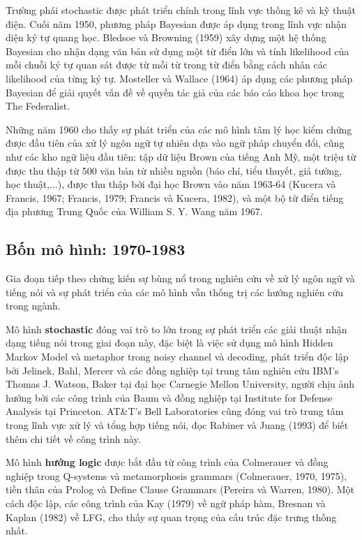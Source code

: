 Trường phái stochastic được phát triển chính trong lĩnh vực thống kê và kỹ thuật điện. Cuối năm 1950, phương pháp Bayesian được áp dụng trong lĩnh vực nhận diện ký tự quang học. Bledsoe và Browning (1959) xây dựng một hệ thống Bayesian cho nhận dạng văn bản sử dụng một từ điển lớn và tính likelihood của mỗi chuỗi ký tự quan sát được từ mỗi từ trong từ điển bằng cách nhân các likelihood của từng ký tự. Mosteller và Wallace (1964) áp dụng các phương pháp Bayesian để giải quyết vấn đề về quyền tác giả của các báo cáo khoa học trong The Federalist.

Những năm 1960 cho thấy sự phát triển của các mô hình tâm lý học kiểm chứng được đầu tiên của xử lý ngôn ngữ tự nhiên dựa vào ngữ pháp chuyển đổi, cũng như các kho ngữ liệu đầu tiên: tập dữ liệu Brown của tiếng Anh Mỹ, một triệu từ được thu thập từ 500 văn bản từ nhiều nguồn (báo chí, tiểu thuyết, giả tưởng, học thuật,...), được thu thập bởi đại học Brown vào năm 1963-64 (Kucera và Francis, 1967; Francis, 1979; Francis và Kucera, 1982), và một bộ từ điển tiếng địa phương Trung Quốc của William S. Y. Wang năm 1967.

\subsection{Bốn mô hình: 1970-1983}

Gia đoạn tiếp theo chứng kiến sự bùng nổ trong nghiên cứu về xử lý ngôn ngữ và tiếng nói và sự phát triển của các mô hình vẫn thống trị các hướng nghiên cứu trong ngành.

Mô hình \textbf{stochastic} đóng vai trò to lớn trong sự phát triển các giải thuật nhận dạng tiếng nói trong giai đoạn này, đặc biệt là việc sử dụng mô hình Hidden Markov Model và metaphor trong noisy channel và decoding, phát triển độc lập bởi Jelinek, Bahl, Mercer và các đồng nghiệp tại trung tâm nghiên cứu IBM's Thomas J. Watson, Baker tại đại học Carnegie Mellon University, người chịu ảnh hưởng bởi các công trình của Baum và đồng nghiệp tại Institute for Defense Analysis tại Princeton. AT\&T's Bell Laboratories cũng đóng vai trò trung tâm trong lĩnh vực xử lý và tổng hợp tiếng nói, đọc Rabiner và Juang (1993) để biết thêm chi tiết về công trình này.

Mô hình \textbf{hướng logic} được bắt đầu từ công trình của Colmerauer và đồng nghiệp trong Q-systems và metamorphosis grammars (Colmerauer, 1970, 1975), tiền thân của Prolog và Define Clause Grammars (Pereira và Warren, 1980). Một cách độc lập, các công trình của Kay (1979) về ngữ pháp hàm, Bresnan và Kaplan (1982) về LFG, cho thấy sự quan trọng của cấu trúc đặc trưng thống nhất.

